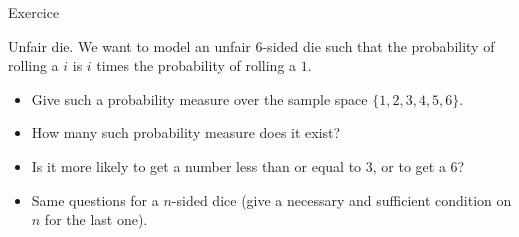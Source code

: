 \documentclass{beamer}
\begin{document}
\begin{frame}{Exercice}
  \begin{exampleblock}{Unfair die.}
    We want to model an unfair $6$-sided die such that the probability of rolling a $i$ is $i$ times the probability of rolling a $1$.
    \begin{itemize}
    \item Give such a probability measure over the sample space $\{ 1,2,3,4,5,6 \}$.
    \item How many such probability measure does it exist?
    \item Is it more likely to get a number less than or equal to $3$, or to get a $6$?
    \item Same questions for a $n$-sided dice (give a necessary and sufficient condition on $n$ for the last one).
    \end{itemize}
  \end{exampleblock}
  
\end{frame}
\end{document}
